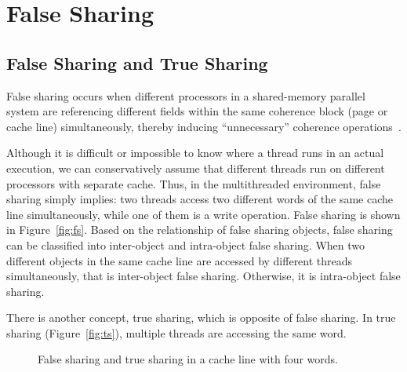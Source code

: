 \section{False Sharing}
\label{sec:falsesharingproblems}

\subsection{False Sharing and True Sharing}
False sharing occurs when different processors in a shared-memory parallel system are referencing different fields within the same coherence block (page or cache line) simultaneously, thereby inducing ``unnecessary'' coherence operations~\cite{Bolosky:1993:FSE:1295480.1295483}. 

Although it is difficult or impossible to know where a thread runs in an actual execution, we can conservatively assume that different threads run on different processors with separate cache. Thus, in the multithreaded environment, false sharing simply implies: two threads access two different words of the same cache line simultaneously, while one of them is a write operation. False sharing is shown in Figure~\ref{fig:fs}. 
Based on the relationship of false sharing objects, 
false sharing can be classified into inter-object and intra-object false sharing. When two different objects in the same cache line are accessed by different threads simultaneously, that is inter-object false sharing. Otherwise, it is intra-object false sharing. 

There is another concept, true sharing, which is opposite of false sharing. In true sharing (Figure~\ref{fig:ts}), multiple threads are accessing the same word. 

\begin{figure}
\begin{center} 
%
\hspace{50pt}
%
\end{center}
\caption{False sharing and true sharing in a cache line with four words. }
\label{fig:fsexample}
\end{figure}

